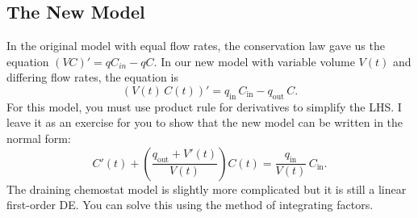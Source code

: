 \documentclass[09pt,letterpaper]{article}
\begin{document}
\subsection*{The New Model}
In the original model with equal flow rates, the conservation law gave us the equation $(VC)' = qC_{in} - qC$. In our new model with variable volume $V(t)$ and differing flow rates, the equation is 
$$
(V(t)\, C(t))' = q_{\text{in}} \,C_{\text{in}} - q_{\text{out}} \,C.
$$
For this model, you must use product rule for derivatives to simplify the LHS. I leave it as an exercise for you to show that the new model can be written in the normal form:
\[
C'(t)
+
\left(
 \frac{q_{\text{out}}+V'(t)}{V(t)}
\right) C(t)
=
\frac{q_{\text{in}}}{V(t)}\,C_{\text{in}}.
\]
The draining chemostat model is slightly more complicated but it is still a linear first-order DE. You can solve this using the method of integrating factors.
\end{document}
